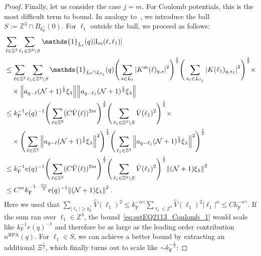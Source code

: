 \documentclass[12pt,a4paper]{article}
\numberwithin{equation}{section}
\newcommand{\1}{\mathbb{I}}
\newcommand{\F}{\mathrm{F}}
\newcommand{\I}{\mathrm{I}}
\newcommand{\RPA}{\mathrm{RPA}}
\newcommand{\Zstar}{\mathbb{Z}^3} %
\newcommand{\Z}{\mathbb{Z}}
\newcommand{\NN}{\mathcal{N}}
\newcommand{\half}{\frac{1}{2}}
\theoremstyle{plain}
\theoremstyle{definition}
\theoremstyle{remark}
\theoremstyle{plain}
\theoremstyle{definition}
\theoremstyle{remark}
\begin{document}
\begin{proof}
Finally, let us consider the case $ j = m $. For Coulomb potentials, this is the most difficult term to bound. In analogy to~\cite{CHN24}, we introduce the ball $ S := \Zstar \cap B_{k_{\F}^{\gamma}}(0) $. For $ \ell_1 $ outside the ball, we proceed as follows:
\begin{align}
	&\sum_{\ell \in \Zstar} \sum_{\ell_1 \in \Zstar \setminus S} \mathds{1}_{L_\ell}(q) |\I_m(\ell, \ell_1)| \nonumber\\
	&\leq \sum_{\ell \in \Zstar} \sum_{\ell_1 \in \Zstar \setminus S} \mathds{1}_{L_\ell \cap L_{\ell_1}}(q) \Bigg(\sum\limits_{s \in L_{\ell}} \abs{K^m(\ell)_{q,s}}^2\Bigg)^\half
		\Bigg(\sum\limits_{s_1 \in L_{\ell_1}} \abs{K(\ell_1)_{q,s_1}}^2\Bigg)^\half \times \nonumber \\
	& \quad \times \norm{ a_{q-\ell} (\NN+1)^{\half} \xi_\lambda}
		\norm{ a_{q-\ell_1} (\NN+1)^{\half} \xi_\lambda }\nonumber\\
	&\leq k_{\F}^{-1} e(q)^{-1}
		\Bigg( \sum_{\ell \in \Zstar} (C \hat{V}(\ell))^{2m} \Bigg)^{\half}
		\Bigg( \sum_{\ell_1 \in \Zstar \setminus S} \hat{V}(\ell_1)^2 \Bigg)^{\half} \times \nonumber \\
	& \quad \times 
		\Bigg( \sum_{\ell \in \Zstar} \norm{ a_{q-\ell} (\NN+1)^{\half} \xi_\lambda}^2 \Bigg)^{\half}
		\Bigg( \sum_{\ell_1 \in \Zstar} \norm{ a_{q-\ell_1} (\NN+1)^{\half} \xi_\lambda }^2 \Bigg)^{\half} \nonumber\\
	&\leq k_{\F}^{-1} e(q)^{-1}
		\Bigg( \sum_{\ell \in \Zstar} (C \hat{V}(\ell))^{2m} \Bigg)^{\half}
		\Bigg( \sum_{\ell_1 \in \Zstar \setminus S} \hat{V}(\ell_1)^2 \Bigg)^{\half} \norm{(\NN+1) \xi_\lambda}^2 \nonumber\\
	&\leq C^m k_{\F}^{-1-\frac{\alpha \gamma}{2}} e(q)^{-1}
		\norm{(\NN+1) \xi_\lambda}^2 \;. \label{eq:estEQ2113_Coulomb_1}
\end{align}
Here we used that $ \sum_{|\ell_1| \ge k_{\F}^\gamma} \hat{V}(\ell_1)^2 \le k_{\F}^{-\alpha \gamma} \sum_{\ell_1 \in \Zstar} \hat{V}(\ell_1)^2 |\ell_1|^\alpha \le C k_{\F}^{-\alpha \gamma} $.
If the sum ran over $ \ell_1 \in \Zstar $, the bound~\eqref{eq:estEQ2113_Coulomb_1} would scale like $ k_{\F}^{-1} e(q)^{-1} $ and therefore be as large as the leading order contribution $ n^{\RPA}(q) $. For $ \ell_1 \in S $, we can achieve a better bound by extracting an additional $ \Xi^{\half} $, which finally turns out to scale like $ \sim k_{\F}^{-\half} $:

\end{proof}
\end{document}
